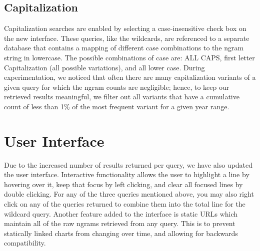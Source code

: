 \documentclass[11pt,a4paper]{article}
\begin{document}
\subsection{Capitalization}
Capitalization searches are enabled by selecting a case-insensitive check box on the new interface. These queries, like the wildcards, are referenced to a separate database that contains a mapping of different case combinations to the ngram string in lowercase. The possible combinations of case are: ALL CAPS, first letter Capitalization (all possible variations), and all lower case. During experimentation, we noticed that often there are many capitalization variants of a given query for which the ngram counts are negligible; hence, to keep our retrieved results meaningful, we filter out all variants that have a cumulative count of less than 1\% of the most frequent variant for a given year range.



\section{User Interface}
\label{sec:interface}
Due to the increased number of results returned per query, we have also updated the user interface. Interactive functionality allows the user to highlight a line by hovering over it, keep that focus by left clicking, and clear all focused lines by double clicking. For any of the three queries mentioned above, you may also right click on any of the queries returned to combine them into the total line for the wildcard query. Another feature added to the interface is static URLs which maintain all of the raw ngrams retrieved from any query. This is to prevent statically linked charts from changing over time, and allowing for backwards compatibility.
\end{document}
